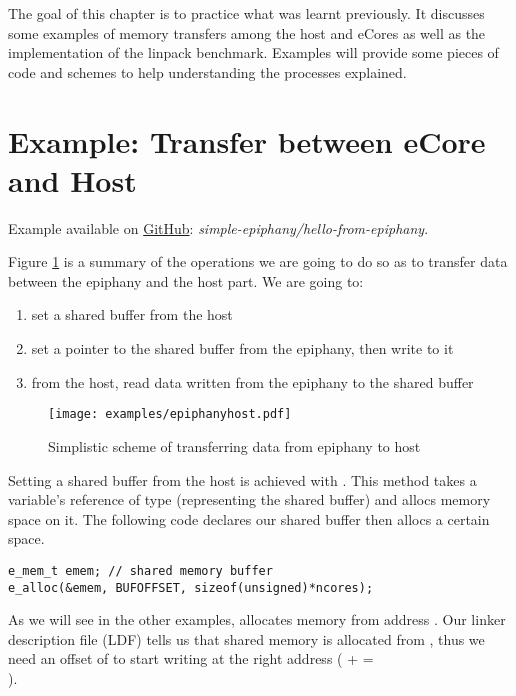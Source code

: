 The goal of this chapter is to practice what was learnt previously. It discusses some examples of memory transfers among the host and \glspl{eCore} as well as the implementation of the linpack benchmark. Examples will provide some pieces of code and schemes to help understanding the processes explained.

\section[Example 1]{Example: Transfer between \gls{eCore} and Host}

Example available on \href{https://github.com/nkcr/parallella-computing/blob/master/simple-epiphany/}{GitHub}\cite{githubproject}: \textit{simple-epiphany/hello-from-epiphany}.

Figure \ref{fig epiphanyhost} is a summary of the operations we are going to do so as to transfer data between the \gls{epiphany} and the host part. We are going to:

\begin{enumerate}
  \item set a shared buffer from the host
  \item set a pointer to the shared buffer from the \gls{epiphany}, then write to it
  \item from the host, read data written from the epiphany to the shared buffer
\end{enumerate}

\begin{figure}[h!]
\centering
\texttt{[image: examples/epiphanyhost.pdf]}
\caption{Simplistic scheme of transferring data from epiphany to host}
\label{fig epiphanyhost}
\end{figure}

Setting a shared buffer from the host is achieved with . This method takes a variable's reference of type  (representing the shared buffer) and allocs memory space on it. The following code declares our shared buffer then allocs a certain space.

\begin{lstlisting}
e_mem_t emem; // shared memory buffer
e_alloc(&emem, BUFOFFSET, sizeof(unsigned)*ncores);
\end{lstlisting}

As we will see in the other examples,  allocates memory from address . Our linker description file (\gls{LDF}) tells us that shared memory is allocated from , thus we need an offset of  to start writing at the right address ( +  =\\ ).

